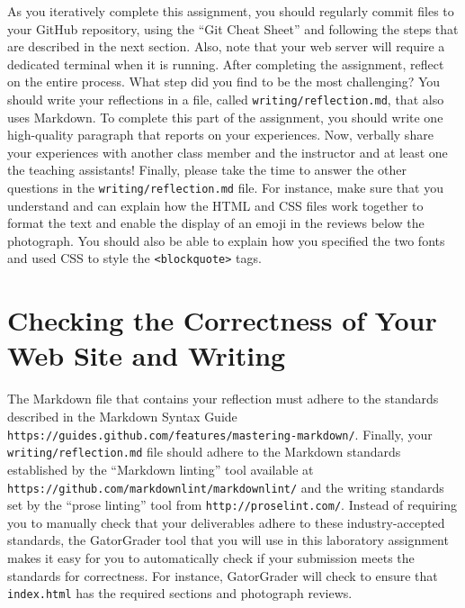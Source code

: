 \documentclass[11pt]{article}
\newcommand{\mainprogram}{\lstinline{index.html}}
\newcommand{\reflection}{\lstinline{writing/reflection.md}}
\newcommand{\program}[1]{\lstinline{#1}}
\newcommand{\url}[1]{\lstinline{#1}}
\newcommand{\step}[1]{``{#1}''}
\begin{document}
As you iteratively complete this assignment, you should regularly commit files
to your GitHub repository, using the ``Git Cheat Sheet'' and following the steps
that are described in the next section. Also, note that your web server will
require a dedicated terminal when it is running. After completing the
assignment, reflect on the entire process. What step did you find to be the most
challenging? You should write your reflections in a file, called \reflection{},
that also uses Markdown. To complete this part of the assignment, you should
write one high-quality paragraph that reports on your experiences. Now, verbally
share your experiences with another class member and the instructor and at least
one the teaching assistants! Finally, please take the time to answer the other
questions in the \reflection{} file. For instance, make sure that you understand
and can explain how the HTML and CSS files work together to format the text and
enable the display of an emoji in the reviews below the photograph. You should
also be able to explain how you specified the two fonts and used CSS to style
the \program{<blockquote>} tags.

\section*{Checking the Correctness of Your Web Site and Writing}

The Markdown file that contains your reflection must adhere to the standards
described in the Markdown Syntax Guide
\url{https://guides.github.com/features/mastering-markdown/}. Finally, your
\reflection{} file should adhere to the Markdown standards established by the
\step{Markdown linting} tool available at
\url{https://github.com/markdownlint/markdownlint/} and the writing standards
set by the \step{prose linting} tool from \url{http://proselint.com/}. Instead
of requiring you to manually check that your deliverables adhere to these
industry-accepted standards, the GatorGrader tool that you will use in this
laboratory assignment makes it easy for you to automatically check if your
submission meets the standards for correctness. For instance, GatorGrader will
check to ensure that \mainprogram{} has the required sections and photograph
reviews.
\end{document}
